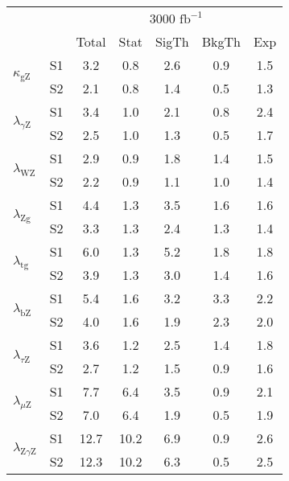 \begin{tabular}{@{} l c c@{\hskip 0.15in} c c c c @{}}
  \hline
  &  & \multicolumn{5}{c}{3000 $\text{fb}^{-1}$} \\
  &  & Total & Stat & SigTh & BkgTh & Exp \\
  \hline
  \multirow{2}{*}{$\kappa_{\mathrm{gZ}}$} & S1  & 3.2   & 0.8   & 2.6   & 0.9   & 1.5  \\[1pt] 
  & S2  & 2.1   & 0.8   & 1.4   & 0.5   & 1.3  \\[4pt] 
  \multirow{2}{*}{$\lambda_{\gamma\mathrm{Z}}$} & S1  & 3.4   & 1.0   & 2.1   & 0.8   & 2.4  \\[1pt]
  & S2  & 2.5   & 1.0   & 1.3   & 0.5   & 1.7  \\[4pt]
  \multirow{2}{*}{$\lambda_{\mathrm{WZ}}$} & S1 & 2.9   & 0.9   & 1.8   & 1.4   & 1.5  \\[1pt] 
  & S2  & 2.2   & 0.9   & 1.1   & 1.0   & 1.4  \\[4pt]
  \multirow{2}{*}{$\lambda_{\mathrm{Zg}}$} & S1 & 4.4   & 1.3   & 3.5   & 1.6   & 1.6  \\[1pt]  
  & S2  & 3.3   & 1.3   & 2.4   & 1.3   & 1.4  \\[4pt]
  \multirow{2}{*}{$\lambda_{\mathrm{tg}}$} & S1 & 6.0   & 1.3   & 5.2   & 1.8   & 1.8  \\[1pt]  
  & S2  & 3.9   & 1.3   & 3.0   & 1.4   & 1.6  \\[4pt]
  \multirow{2}{*}{$\lambda_{\mathrm{bZ}}$} & S1 & 5.4   & 1.6   & 3.2   & 3.3   & 2.2  \\[1pt] 
  & S2  & 4.0   & 1.6   & 1.9   & 2.3   & 2.0  \\[4pt]
  \multirow{2}{*}{$\lambda_{\tau\mathrm{Z}}$} & S1  & 3.6   & 1.2   & 2.5   & 1.4   & 1.8  \\[1pt]
  & S2  & 2.7   & 1.2   & 1.5   & 0.9   & 1.6  \\[4pt]
  \multirow{2}{*}{$\lambda_{\mu\mathrm{Z}}$} & S1 & 7.7   & 6.4   & 3.5   & 0.9   & 2.1  \\[1pt] 
  & S2  & 7.0   & 6.4   & 1.9   & 0.5   & 1.9  \\[4pt]
  \multirow{2}{*}{$\lambda_{\mathrm{Z}\gamma\mathrm{Z}}$} & S1 & 12.7  & 10.2  & 6.9   & 0.9   & 2.6  \\[1pt] 
  & S2  & 12.3  & 10.2  & 6.3   & 0.5   & 2.5  \\[4pt]
  \hline
\end{tabular}
